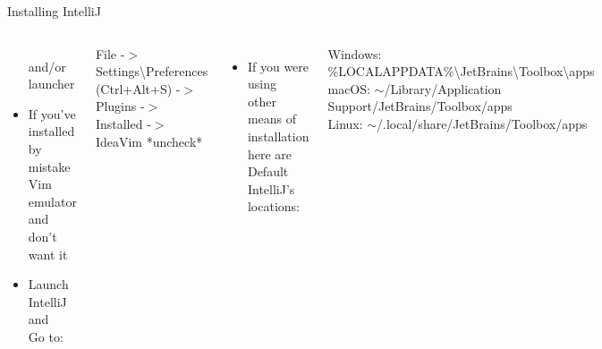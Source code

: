 \documentclass[aspectratio=1610,english]{beamer} %
\begin{document}
\begin{frame}{Installing IntelliJ}
\begin{columns}
\begin{itemize}
						and/or launcher
					\item If you've installed by mistake \\ 
						Vim emulator and don't want it 
					\item Launch IntelliJ and \\
						Go to:
				\end{itemize}
				\tiny
				 File -$>$ Settings\textbackslash Preferences (Ctrl+Alt+S) -$>$ Plugins -$>$ \\ 
				 Installed -$>$ IdeaVim *uncheck*
				\begin{itemize}
					\small
					\color{black}
					\item If you were using other means of installation \\ 
						here are Default IntelliJ's locations:
				\end{itemize}
				\tiny
				Windows: \%LOCALAPPDATA\%\textbackslash JetBrains\textbackslash Toolbox\textbackslash apps \\
      			macOS: $\sim$/Library/Application Support/JetBrains/Toolbox/apps \\
      			Linux: $\sim$/.local/share/JetBrains/Toolbox/apps 
		\end{columns}
	\end{frame}
\end{document}
